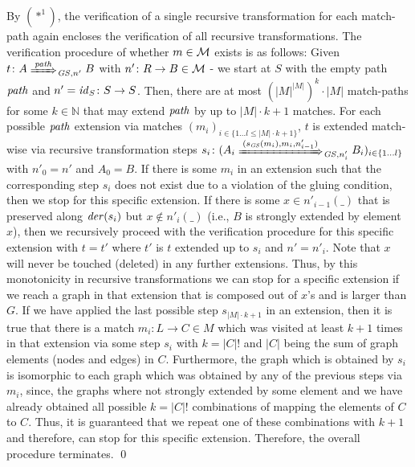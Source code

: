 \begin{enumerate}
\begin{enumerate}
  By $(*^1)$, the verification of a single recursive transformation for each match-path again encloses the verification of all recursive transformations.
  The verification procedure of whether $m \in {\cal M}$ exists is as follows:
  Given $t\colon A \Trans{\paths}_{\GS,n'} B$ with $n'\colon R \to B \in {\cal M}$ - we start at $S$ with the empty path $\mathit{path}$ and $n'=\mathit{id}_S\colon S \to S$.
  Then, there are at most $(\left\vert{M}\right\vert^{\left\vert{M}\right\vert})^k\cdot \left\vert{M}\right\vert$ match-paths for some $k \in \mathbb{N}$ that may extend $\mathit{path}$ by up to $\left\vert{M}\right\vert \cdot k + 1$ matches.
  For each possible $\mathit{path}$ extension via matches $(m_i)_{i \in \{1\ldots l \leq \left\vert{M}\right\vert \cdot k + 1\}}$, $t$ is extended match-wise via recursive transformation steps $s_i\colon (A_i \Trans{(s_\GS(m_i),m_i,n'_{i-1})}_{\GS,n'_i} B_i)_{i \in \{1\ldots l\}}$ with $n'_0=n'$ and $A_0=B$.
  If there is some $m_i$ in an extension such that the corresponding step $s_i$ does not exist due to a violation of the gluing condition, then we stop for this specific extension.
  If there is some $x \in n'_{i-1}(\_)$ that is preserved along $\mathit{der}(s_i)$ but $x \not\in n'_i(\_)$ (i.e., $B$ is strongly extended by element $x$), then we recursively proceed with the verification procedure for this specific extension with $t=t'$ where $t'$ is $t$ extended up to $s_i$ and $n'=n'_i$.
  Note that $x$ will never be touched (deleted) in any further extensions.
  Thus, by this monotonicity in recursive transformations we can stop for a specific extension if we reach a graph in that extension that is composed out of $x$'s and is larger than $G$.
  If we have applied the last possible step $s_{\left\vert{M}\right\vert \cdot k + 1}$ in an extension, then it is true that there is a match $m_i\colon L \to C \in M$ which was visited at least $k + 1$ times in that extension via some step $s_i$ with $k=\left\vert{C}\right\vert!$ and $\left\vert{C}\right\vert$ being the sum of graph elements (nodes and edges) in $C$.
  Furthermore, the graph which is obtained by $s_i$ is isomorphic to each graph which was obtained by any of the previous steps via $m_i$, since, the graphs where not strongly extended by some element and we have already obtained all possible $k=\left\vert{C}\right\vert !$ combinations of mapping the elements of $C$ to $C$.
  Thus, it is guaranteed that we repeat one of these combinations with $k+1$ and therefore, can stop for this specific extension.
  Therefore, the overall procedure terminates.
  \qed
  \end{enumerate}
\end{enumerate}


